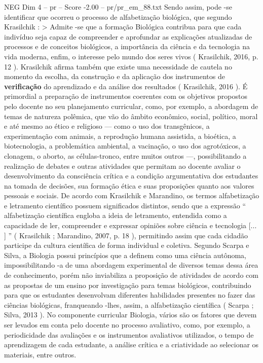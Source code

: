 \begin{textsample}{NEG Dim 4 – pr – Score -2.00 – pr/pr\_em\_88.txt}
Sendo assim, pode -se identificar que ocorreu o processo de alfabetização biológica, que segundo Krasilchik : > Admite -se que a formação Biológica contribua para que cada indivíduo seja capaz de compreender e aprofundar as explicações atualizadas de processos e de conceitos biológicos, a importância da ciência e da tecnologia na vida moderna, enfim, o interesse pelo mundo dos seres vivos ( Krasilchik, 2016, p. 12 ).
Krasilchik afirma também que existe uma necessidade de cautela no momento da escolha, da construção e da aplicação dos instrumentos de \textbf{verificação} do aprendizado e da análise dos resultados ( Krasilchik, 2016 ).
É primordial a preparação de instrumentos coerentes com os objetivos propostos pelo docente no seu planejamento curricular, como, por exemplo, a abordagem de temas de natureza polêmica, que vão do âmbito econômico, social, político, moral e até mesmo ao ético e religioso — como o uso dos transgênicos, a experimentação com animais, a reprodução humana assistida, a bioética, a biotecnologia, a problemática ambiental, a vacinação, o uso dos agrotóxicos, a clonagem, o aborto, as células-tronco, entre muitos outros —, possibilitando a realização de debates e outras atividades que permitam ao docente avaliar o desenvolvimento da consciência crítica e a condição argumentativa dos estudantes na tomada de decisões, sua formação ética e suas proposições quanto aos valores pessoais e sociais.
De acordo com Krasilchik e Marandino, os termos alfabetização e letramento científico possuem significados distintos, sendo que a expressão “ alfabetização científica engloba a ideia de letramento, entendida como a capacidade de ler, compreender e expressar opiniões sobre ciência e tecnologia [... ] ” ( Krasilchik ; Marandino, 2007, p. 18 ), permitindo assim que cada cidadão participe da cultura científica de forma individual e coletiva.
Segundo Scarpa e Silva, a Biologia possui princípios que a definem como uma ciência autônoma, impossibilitando -a de uma abordagem experimental de diversos temas dessa área de conhecimento, porém não inviabiliza a proposição de atividades de acordo com as propostas de um ensino por investigação para temas biológicos, contribuindo para que os estudantes desenvolvam diferentes habilidades presentes no fazer das ciências biológicas, franqueando -lhes, assim, a alfabetização científica ( Scarpa ; Silva, 2013 ).
No componente curricular Biologia, vários são os fatores que devem ser levados em conta pelo docente no processo avaliativo, como, por exemplo, a periodicidade das avaliações e os instrumentos avaliativos utilizados, o tempo de aprendizagem de cada estudante, a análise crítica e a criatividade ao selecionar os materiais, entre outros.

\end{textsample}
